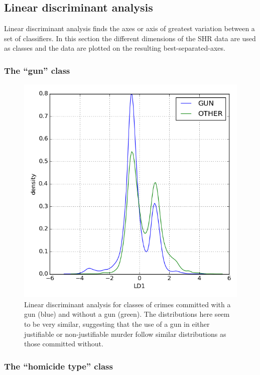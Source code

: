 \documentclass{evanarticle}
\begin{document}
\subsection{Linear discriminant analysis}

Linear discriminant analysis finds the axes or axis of greatest variation between a set of classifiers.  In this section the different dimensions of the SHR data are used as classes and the data are plotted on the resulting best-separated-axes.

\subsubsection{The ``gun'' class}

\begin{figure}[H]
  \centering
    \includegraphics[width=\linewidth]{images/gun/gun.png}
  \caption{Linear discriminant analysis for classes of crimes committed with a gun (blue) and without a gun (green).  The distributions here seem to be very similar, suggesting that the use of a gun in either justifiable or non-justifiable murder follow similar distributions as those committed without.}
\end{figure}

\subsubsection{The ``homicide type'' class}
\end{document}
